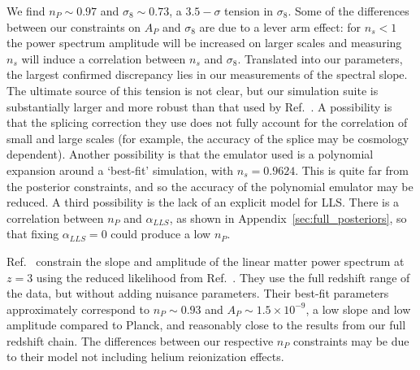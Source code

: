 We find $n_P \sim 0.97$ and $\sigma_8 \sim 0.73$, a $3.5-\sigma$ tension in $\sigma_8$. Some of the differences between our constraints on $A_P$ and $\sigma_8$ are due to a lever arm effect: for $n_s < 1$ the power spectrum amplitude will be increased on larger scales and measuring $n_s$ will induce a correlation between $n_s$ and $\sigma_8$. Translated into our parameters, the largest confirmed discrepancy lies in our measurements of the spectral slope. The ultimate source of this tension is not clear, but our simulation suite is substantially larger and more robust than that used by Ref.~\cite{2020JCAP...04..038P}. A possibility is that the splicing correction they use does not fully account for the correlation of small and large scales (for example, the accuracy of the splice may be cosmology dependent). Another possibility is that the emulator used is a polynomial expansion around a `best-fit' simulation, with $n_s = 0.9624$. This is quite far from the posterior constraints, and so the accuracy of the polynomial emulator may be reduced. A third possibility is the lack of an explicit model for LLS. There is a correlation between $n_P$ and $\alpha_{LLS}$, as shown in Appendix~\ref{sec:full_posteriors}, so that fixing $\alpha_{LLS} = 0$ could produce a low $n_P$.

Ref.~\cite{2023arXiv230300746G} constrain the slope and amplitude of the linear matter power spectrum at $z=3$ using the reduced likelihood from Ref.~\cite{2023ApJ...944..223P}.
They use the full redshift range of the data, but without adding nuisance parameters.
Their best-fit parameters approximately correspond to $n_P \sim 0.93$ and $A_P \sim 1.5 \times 10^{-9}$, a low slope and low amplitude compared to Planck, and reasonably close to the results from our full redshift chain. The differences between our respective $n_P$ constraints may be due to their model not including helium reionization effects.



